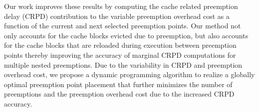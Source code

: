 \newline
\indent
Our work improves these results by computing the cache related preemption delay (CRPD) contribution to the variable preemption overhead cost as a function of the current and next selected preemption points.  Our method not only accounts for the cache blocks evicted due to preemption, but also accounts for the cache blocks that are reloaded during execution between preemption points thereby improving the accuracy of marginal CRPD computations for multiple nested preemptions.  
Due to the variability in CRPD and preemption overhead cost, we propose a dynamic programming algorithm to realize a globally optimal preemption point placement that further minimizes the number of preemptions and the preemption overhead cost due to the increased CRPD accuracy.
